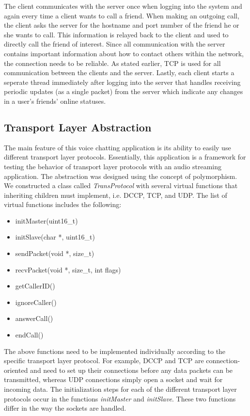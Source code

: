 The client communicates with the server once when logging into the system and
again every time a client wants to call a friend.  When making an outgoing call,
the client asks the server for the hostname and port number of the friend he or
she wants to call.  This information is relayed back to the client and used to
directly call the friend of interest.  Since all communication with the server contains important information about how to contact others within the 
network, the connection needs to be reliable. As stated earlier, TCP is used for all 
communication between the clients and the server. Lastly, each client starts a seperate thread
immediately after logging into the server that handles receiving
periodic updates (as a single packet) from the server which indicate any changes in a user's friends'
online statuses. 


\subsection{Transport Layer Abstraction}
\label{subsec:transport_abs}

The main feature of this voice chatting application is its ability to easily 
use different transport layer protocols.  Essentially, this application
is a framework for testing the behavior of transport layer protocols with an
audio streaming application.  The abstraction was designed using the concept of
polymorphism.  We constructed a class called \textit{TransProtocol} 
with several virtual functions that inheriting children must implement, i.e. DCCP,
TCP, and UDP.  The list of virtual functions includes the following:

\begin{itemize}
   \item{initMaster(uint16\_t)}
   \item{initSlave(char *, uint16\_t)}
   \item{sendPacket(void *, size\_t)}
   \item{recvPacket(void *, size\_t, int flags)}
   \item{getCallerID()}
   \item{ignoreCaller()}
   \item{answerCall()}
   \item{endCall()}
\end{itemize}

The above functions need to be implemented individually according to the specific
transport layer protocol.  For example, DCCP and TCP are connection-oriented and
need to set up their connections before any data
packets can be transmitted, whereas UDP connections simply open a socket and
wait for incoming data.  The initialization steps for each of the
different transport layer protocols occur in the functions \textit{initMaster} and
\textit{initSlave}.  These two functions differ in the way the sockets are handled.

